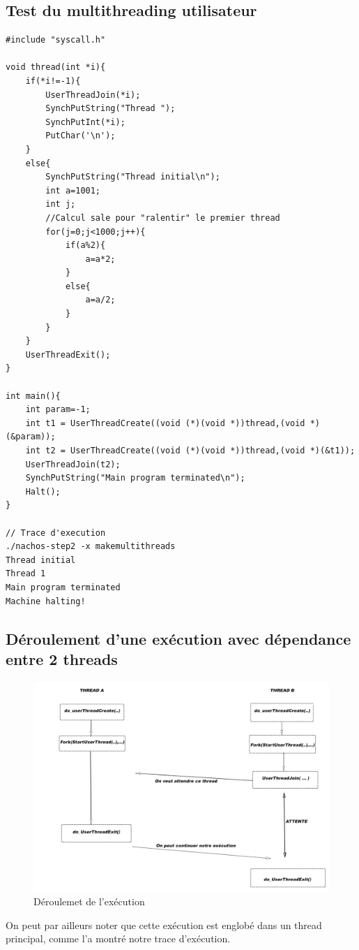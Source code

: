 \documentclass[a4paper,10pt]{article}
\begin{document}
\subsection{Test du multithreading utilisateur}

\begin{lstlisting}[frame=single]
 #include "syscall.h"

void thread(int *i){
	if(*i!=-1){
		UserThreadJoin(*i);
		SynchPutString("Thread ");
		SynchPutInt(*i);
		PutChar('\n');
	}
	else{
		SynchPutString("Thread initial\n");
		int a=1001;
		int j;	
		//Calcul sale pour "ralentir" le premier thread
		for(j=0;j<1000;j++){
			if(a%2){
				a=a*2;
			}
			else{
				a=a/2;
			}
		}
	}
	UserThreadExit();
}

int main(){
	int param=-1;
	int t1 = UserThreadCreate((void (*)(void *))thread,(void *)(&param));
	int t2 = UserThreadCreate((void (*)(void *))thread,(void *)(&t1));
	UserThreadJoin(t2);
	SynchPutString("Main program terminated\n");
	Halt();
}

// Trace d'execution
./nachos-step2 -x makemultithreads
Thread initial
Thread 1
Main program terminated
Machine halting!
\end{lstlisting}
\newpage
\subsection{Déroulement d'une exécution avec dépendance entre 2 threads}
\begin{figure}[h]
  \begin{center}
    \includegraphics[scale=0.4]{./nachos_join.png}
   \caption{\label{join} Déroulemet de l'exécution}
  \end{center}
\end{figure}

On peut par ailleurs noter que cette exécution est englobé dans un thread principal, comme l'a montré notre trace d'exécution.
\end{document}
